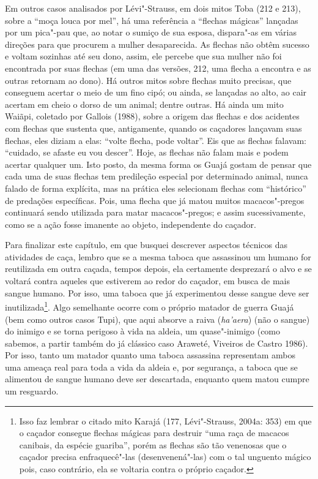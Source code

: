 Em outros casos analisados por Lévi"-Strauss, em dois mitos Toba (212 e
213), sobre a ``moça louca por mel'', há uma referência a ``flechas
mágicas'' lançadas por um pica"-pau que, ao notar o sumiço de sua esposa,
dispara"-as em várias direções para que procurem a mulher desaparecida.
As flechas não obtêm sucesso e voltam sozinhas até seu dono, assim, ele
percebe que sua mulher não foi encontrada por suas flechas (em uma das
versões, 212, uma flecha a encontra e as outras retornam ao dono). Há
outros mitos sobre flechas muito precisas, que conseguem acertar o meio
de um fino cipó; ou ainda, se lançadas ao alto, ao cair acertam em cheio
o dorso de um animal; dentre outras. Há ainda um mito Waiãpi, coletado
por Gallois (1988), sobre a origem das flechas e dos acidentes com
flechas que sustenta que, antigamente, quando os caçadores lançavam suas
flechas, eles diziam a elas: ``volte flecha, pode voltar''. Eis que as
flechas falavam: ``cuidado, se afaste eu vou descer''. Hoje, as flechas
não falam mais e podem acertar qualquer um. Isto posto, da mesma forma
os Guajá gostam de pensar que cada uma de suas flechas tem predileção
especial por determinado animal, nunca falado de forma explícita, mas na
prática eles selecionam flechas com ``histórico'' de predações
específicas. Pois, uma flecha que já matou muitos macacos"-pregos
continuará sendo utilizada para matar macacos"-pregos; e assim
sucessivamente, como se a ação fosse imanente ao objeto, independente do
caçador.

Para finalizar este capítulo, em que busquei descrever aspectos técnicos
das atividades de caça, lembro que se a mesma taboca que assassinou um
humano for reutilizada em outra caçada, tempos depois, ela certamente
desprezará o alvo e se voltará contra aqueles que estiverem ao redor do
caçador, em busca de mais sangue humano. Por isso, uma taboca que já
experimentou desse sangue deve ser inutilizada\footnote{Isso faz lembrar
  o citado mito Karajá (177, Lévi"-Strauss, 2004a: 353) em que o caçador
  consegue flechas mágicas para destruir ``uma raça de macacos canibais,
  da espécie guariba'', porém as flechas são tão venenosas que o caçador
  precisa enfraquecê"-las (desenvenená"-las) com o tal unguento mágico
  pois, caso contrário, ela se voltaria contra o próprio caçador.}. Algo
semelhante ocorre com o próprio matador de guerra Guajá (bem como outros
casos Tupi), que aqui absorve a raiva (\emph{ha'aera}) (não o sangue) do
inimigo e se torna perigoso à vida na aldeia, um quase"-inimigo (como
sabemos, a partir também do já clássico caso Araweté, Viveiros de Castro
1986). Por isso, tanto um matador quanto uma taboca assassina
representam ambos uma ameaça real para toda a vida da aldeia e, por
segurança, a taboca que se alimentou de sangue humano deve ser
descartada, enquanto quem matou cumpre um resguardo.

